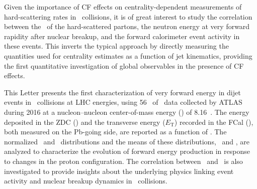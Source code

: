 \documentclass[PAPER, atlasdraft=false, USenglish, cernpreprint]{atlasdoc}
\begin{document}
Given the importance of CF effects on centrality-dependent measurements of hard-scattering rates in \pxPb\ collisions, it is of great interest to study the correlation between the \kin\ of the hard-scattered partons, the neutron energy at very forward rapidity after nuclear breakup, and the forward calorimeter event activity in these events. 
This inverts the typical approach by directly measuring the quantities used for centrality estimates as a function of jet kinematics, providing the first quantitative investigation of global observables in the presence of CF effects.


This Letter presents the first characterization of very forward energy in dijet events in \pxPb\ collisions at LHC energies, using 56 \NB\ of \pxPb\ data collected by ATLAS during 2016 at a nucleon--nucleon center-of-mass energy (\SNN) of 8.16~\TeV. 
The energy deposited in the ZDC (\EZDC) and the transverse energy ($E_\mathrm{T}$) recorded in the FCal (\ETPB), both measured on the Pb-going side, are reported as a function of 
\xp.
The normalized \EZDC\ and \ETPB\ distributions 
and the means of these distributions, \AZDC\ and \EATPB, are analyzed to characterize the evolution of forward energy production in response to changes in the proton configuration.
The correlation between \ETPB\ and \EZDC\ is also investigated to provide insights about the underlying physics linking event activity and nuclear breakup dynamics in \pxPb\ collisions.  
\end{document}
